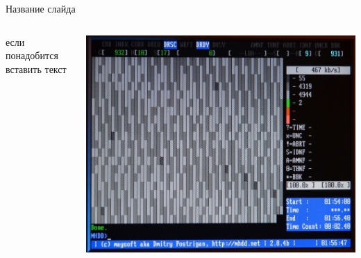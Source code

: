 \documentclass{beamer}
\begin{document}
\begin{frame}{Название слайда}
    \begin{columns}[T]
        \begin{column}{0.6\textwidth}
        если понадобится вставить текст
        \end{column}
        \begin{column}{0.4\textwidth}
            \includegraphics[width=\textwidth]{images/MHDD.jpeg}
        \end{column}
    \end{columns}
\end{frame}
\end{document}
